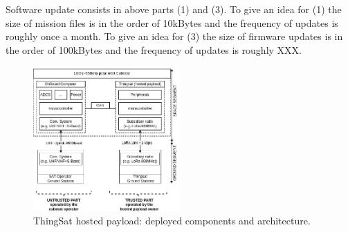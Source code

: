 
Software update consists in above parts (1) and (3). To give an idea
for (1) the size of mission files is in the order of 10kBytes and the frequency of updates is roughly once a month. 
To give an idea 
for (3) the size of firmware updates is in the order of 100kBytes and the frequency of updates is roughly XXX.

\begin{figure}[t]
    \includegraphics[width=0.5\textwidth]{Figures/globecom-thingsat-mods.jpg}
    \caption{ThingSat hosted payload: deployed components and architecture.}
    \label{fig:thingsat-archi}
\end{figure}